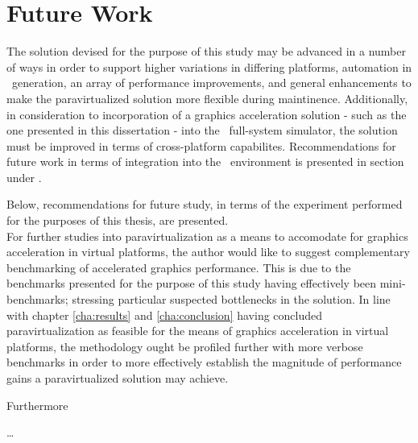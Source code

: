 
\chapter{Future Work}
\label{cha:futurework}
The solution devised for the purpose of this study may be advanced in a number of ways in order to support higher variations in differing platforms, automation in \dvttermabi\ generation, an array of performance improvements, and general enhancements to make the paravirtualized solution more flexible during maintinence.
Additionally, in consideration to incorporation of a graphics acceleration solution - such as the one presented in this dissertation - into the \dvttermsimics\ full-system simulator, the solution must be improved in terms of cross-platform capabilites.
Recommendations for future work in terms of integration into the \dvttermsimics\ environment is presented in section  under .

Below, recommendations for future study, in terms of the experiment performed for the purposes of this thesis, are presented.\\

\noindent
For further studies into paravirtualization as a means to accomodate for graphics acceleration in virtual platforms, the author would like to suggest complementary benchmarking of accelerated graphics performance.
This is due to the benchmarks presented for the purpose of this study having effectively been mini-benchmarks; stressing particular suspected bottlenecks in the solution.
In line with chapter \ref{cha:results} and \ref{cha:conclusion} having concluded paravirtualization as feasible for the means of graphics acceleration in virtual platforms, the methodology ought be profiled further with more verbose benchmarks in order to more effectively establish the magnitude of performance gains a paravirtualized solution may achieve.

Furthermore


\ldots



